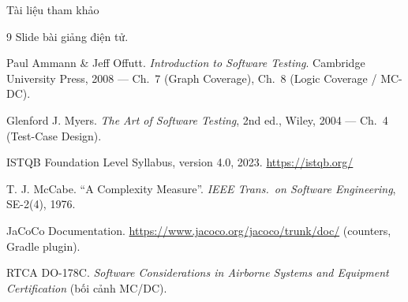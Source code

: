 \documentclass[aspectratio=169,12pt]{beamer}
\begin{document}
\begin{frame}{Tài liệu tham khảo}
  \vspace*{-0.4em}
  \footnotesize
  \begin{thebibliography}{9}
    Slide bài giảng điện tử.

    Paul Ammann \& Jeff Offutt. \textit{Introduction to Software Testing}.
    Cambridge University Press, 2008 --- Ch.~7 (Graph Coverage),
    Ch.~8 (Logic Coverage / MC-DC).

    Glenford J. Myers. \textit{The Art of Software Testing}, 2nd ed.,
    Wiley, 2004 --- Ch.~4 (Test-Case Design).

    ISTQB Foundation Level Syllabus, version 4.0, 2023.
    \url{https://istqb.org/}

    T. J. McCabe. ``A Complexity Measure''.
    \textit{IEEE Trans.\ on Software Engineering}, SE-2(4), 1976.

    JaCoCo Documentation. \url{https://www.jacoco.org/jacoco/trunk/doc/}
    (counters, Gradle plugin).

    RTCA DO-178C. \textit{Software Considerations in Airborne Systems and
    Equipment Certification} (bối cảnh MC/DC).
  \end{thebibliography}
\end{frame}

\end{document}

